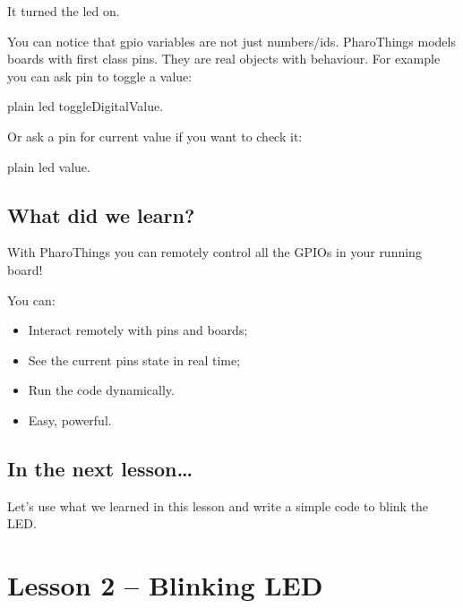 \documentclass[10pt,twoside,english]{_support/latex/sbabook/sbabook}
\begin{document}
It turned the led on.

You can notice that gpio variables are not just numbers/ids. PharoThings models boards with first class pins. They are real objects with behaviour. For example you can ask pin to toggle a value:

\begin{displaycode}{plain}
led toggleDigitalValue.
\end{displaycode}

Or ask a pin for current value if you want to check it:

\begin{displaycode}{plain}
led value.
\end{displaycode}
\section{What did we learn?}
With PharoThings you can remotely control all the GPIOs in your running board!

You can:

\begin{itemize}
\item Interact remotely with pins and boards;
\item See the current pins state in real time;
\item Run the code dynamically.
\item Easy, powerful.
\end{itemize}
\section{In the next lesson…}
Let’s use what we learned in this lesson and write a simple code to blink the LED.
\chapter{Lesson 2 – Blinking LED }

\backmatter

\end{document}
